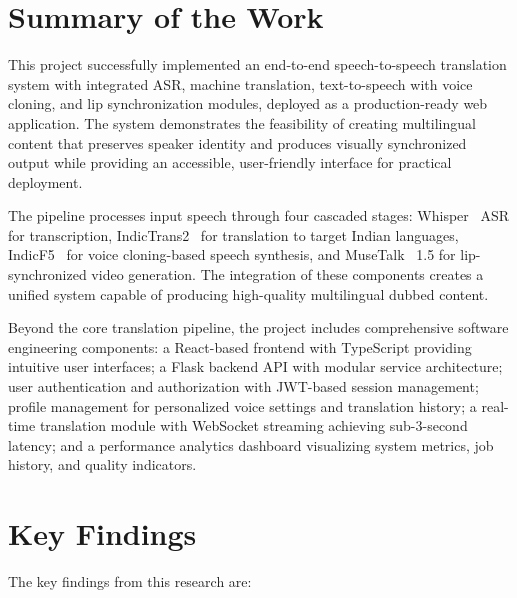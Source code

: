 \documentclass[12pt,oneside]{report}
\begin{document}
\section{Summary of the Work}

This project successfully implemented an end-to-end speech-to-speech translation system with integrated ASR, machine translation, text-to-speech with voice cloning, and lip synchronization modules, deployed as a production-ready web application. The system demonstrates the feasibility of creating multilingual content that preserves speaker identity and produces visually synchronized output while providing an accessible, user-friendly interface for practical deployment.

The pipeline processes input speech through four cascaded stages: Whisper~\cite{radford2023whisper} ASR for transcription, IndicTrans2~\cite{gala2023indictrans2} for translation to target Indian languages, IndicF5~\cite{indicf5_2025} for voice cloning-based speech synthesis, and MuseTalk~\cite{zhang2023musetalk} 1.5 for lip-synchronized video generation. The integration of these components creates a unified system capable of producing high-quality multilingual dubbed content.

Beyond the core translation pipeline, the project includes comprehensive software engineering components: a React-based frontend with TypeScript providing intuitive user interfaces; a Flask backend API with modular service architecture; user authentication and authorization with JWT-based session management; profile management for personalized voice settings and translation history; a real-time translation module with WebSocket streaming achieving sub-3-second latency; and a performance analytics dashboard visualizing system metrics, job history, and quality indicators.


\section{Key Findings}

The key findings from this research are:
\end{document}
